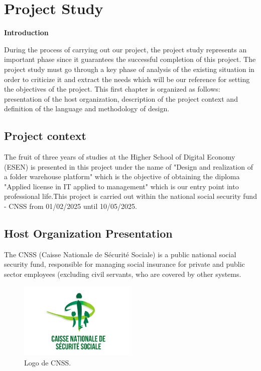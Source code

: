 \chapter{Project Study}
\newpage
\begin{center}
    \centering
    \LARGE\textbf{Introduction} 
     \vspace{1cm} \\
   \raggedright
\end{center}
During the process of carrying out our project, the project study represents an important phase since it guarantees the successful completion of this project. The project study must go through a key phase of analysis of the existing situation in order to criticize it and extract the needs which will be our reference for setting the objectives of the project. This first chapter is organized as follows: presentation of the host organization, description of the project context and definition of the language and methodology of design.

\section{ Project context}
The fruit of three years of studies at the Higher School of Digital Economy (ESEN) is presented in this project under the name of "Design and realization of a folder warehouse platform" which is the objective of obtaining the diploma "Applied license in IT applied to management" which is our entry point into professional life.This project is carried out within the national social security fund - CNSS from 01/02/2025 until 10/05/2025.
\section{Host Organization Presentation}
The CNSS (Caisse Nationale de Sécurité Sociale) is a public national social security fund, responsible for managing social insurance for private and public sector employees (excluding civil servants, who are covered by other systems.\\
\clearpage
\begin{figure}[h]
    \centering
    \includegraphics[width=0.5\textwidth]{figures/logocnss.png}
    \caption{Logo de CNSS.}
\end{figure} \

